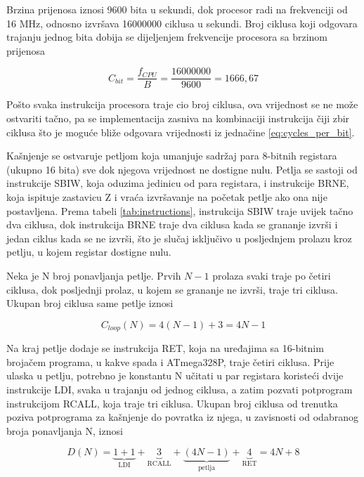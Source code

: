 Brzina prijenosa iznosi 9600 bita u sekundi, dok procesor radi na
frekvenciji od 16 MHz, odnosno izvršava 16000000 ciklusa u sekundi. Broj
ciklusa koji odgovara trajanju jednog bita dobija se dijeljenjem
frekvencije procesora sa brzinom prijenosa

\begin{equation}
    \label{eq:cycles_per_bit}
    C_{bit} = \frac{f_{CPU}}{B} = \frac{16000000}{9600} = 1666{,}67
\end{equation}

Pošto svaka instrukcija procesora traje cio broj ciklusa, ova vrijednost
se ne može ostvariti tačno, pa se implementacija zasniva na kombinaciji
instrukcija čiji zbir ciklusa što je moguće bliže odgovara vrijednosti
iz jednačine \ref{eq:cycles_per_bit}.

Kašnjenje se ostvaruje petljom koja umanjuje sadržaj para 8-bitnih
registara (ukupno 16 bita) sve dok njegova vrijednost ne dostigne nulu. Petlja se sastoji
od instrukcije SBIW, koja oduzima jedinicu od para registara, i
instrukcije BRNE, koja ispituje zastavicu Z i vraća izvršavanje na
početak petlje ako ona nije postavljena. Prema tabeli \ref{tab:instructions},
instrukcija SBIW traje uvijek tačno dva ciklusa, dok instrukcija BRNE
traje dva ciklusa kada se grananje izvrši i jedan ciklus kada se ne
izvrši, što je slučaj isključivo u posljednjem prolazu kroz petlju, u
kojem registar dostigne nulu.

Neka je N broj ponavljanja petlje. Prvih $N - 1$ prolaza svaki traje po
četiri ciklusa, dok posljednji prolaz, u kojem se grananje ne izvrši,
traje tri ciklusa. Ukupan broj ciklusa same petlje iznosi

\begin{equation}
    \label{eq:loop_cost}
    C_{loop}(N) = 4(N - 1) + 3 = 4N - 1
\end{equation}

Na kraj petlje dodaje se instrukcija RET, koja na uređajima sa
16-bitnim brojačem programa, u kakve spada i ATmega328P, traje četiri
ciklusa. Prije ulaska u petlju, potrebno je konstantu N učitati u par
registara koristeći dvije instrukcije LDI, svaka u trajanju od jednog
ciklusa, a zatim pozvati potprogram instrukcijom RCALL, koja traje tri
ciklusa. Ukupan broj ciklusa od trenutka poziva potprograma za kašnjenje
do povratka iz njega, u zavisnosti od odabranog broja ponavljanja N,
iznosi

\begin{equation}
    \label{eq:delay_formula}
    D(N) = \underbrace{1 + 1}_{\text{LDI}} + \underbrace{3}_{\text{RCALL}} + \underbrace{(4N - 1)}_{\text{petlja}} + \underbrace{4}_{\text{RET}} = 4N + 8
\end{equation}

